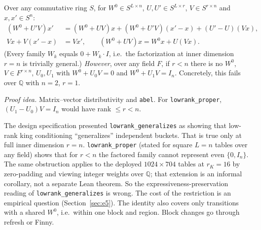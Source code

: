 \begin{theorem}\label{thm:t23}
Over any commutative ring $S$, for $W^0\in S^{L\times n}$, $U,U'\in S^{L\times r}$, $V\in S^{r\times n}$ and $x,x'\in S^n$:
\begin{align*}
(W^0+U'V)x'&=(W^0+UV)x+(W^0+U'V)(x'-x)+(U'-U)(Vx),\\
Vx+V(x'-x)&=Vx',\qquad (W^0+UV)x=W^0x+U(Vx).
\end{align*}
(Every family $W_k$ equals $0+W_k\cdot I$, i.e.\ the factorization at inner dimension $r=n$ is trivially general.)
\emph{However}, over any field $F$, if $r<n$ there is no $W^0$, $V\in F^{r\times n}$, $U_0,U_1$ with $W^0+U_0V=0$ and $W^0+U_1V=I_n$. Concretely, this fails over $\mathbb Q$ with $n=2$, $r=1$.
\end{theorem}
\noindent\emph{Proof idea.} Matrix--vector distributivity and \texttt{abel}. For \texttt{lowrank\_proper}, $(U_1-U_0)V=I_n$ would have rank $\le r<n$.
\begin{remark}[Correction]
The design specification presented \texttt{lowrank\_generalizes} as showing that low-rank king conditioning ``generalizes'' independent buckets.
That is true only at full inner dimension $r=n$.
\texttt{lowrank\_proper} (stated for square $L=n$ tables over any field) shows that for $r<n$ the factored family cannot represent even $\{0,I_n\}$.
The same obstruction applies to the deployed $1024\times704$ tables at $r_K=16$ by zero-padding and viewing integer weights over $\mathbb Q$; that extension is an informal corollary, not a separate Lean theorem.
So the expressiveness-preservation reading of \texttt{lowrank\_generalizes} is wrong.
The cost of the restriction is an empirical question (Section~\ref{sec:e5}).
The identity also covers only transitions with a shared $W^0$, i.e.\ within one block and region. Block changes go through refresh or Finny.
\end{remark}

